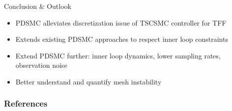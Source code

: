 \documentclass[12pt,svgnames,table,draft=false]{beamer}
\begin{document}
\begin{frame}{Conclusion \& Outlook}

\begin{tcolorbox}[width=.99\textwidth,
colback={blue!10!},
standard jigsaw,
opacityback=1,  %
]  
\begin{itemize}
\item PDSMC alleviates discretization issue of TSCSMC controller for TFF
\item Extends existing PDSMC approaches to respect inner loop constraints 
\end{itemize}
\end{tcolorbox}

\begin{tcolorbox}[width=.99\textwidth,
colback={red!10!},
standard jigsaw,
opacityback=1,  %
]  
\begin{itemize}
\item Extend PDSMC further: inner loop dynamics, lower sampling rates, observation noise
\item Better understand and quantify mesh instability
\end{itemize}
\end{tcolorbox}

\end{frame}


\begin{frame}
\end{frame}

\usebackgroundtemplate{}

\frametitle{References}


        
%  
\end{document}
